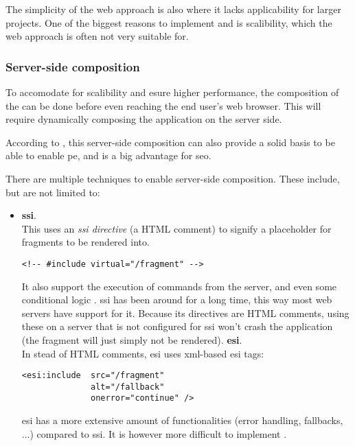 The simplicity of the web approach is also where it lacks applicability for
larger projects. One of the biggest reasons to implement
 and  is scalibility, which the
web approach is often not very suitable for.

\subsubsection{Server-side composition}

To accomodate for scalibility and esure higher performance, the composition of
the  can be done before even reaching the end user's
web browser. This will require dynamically composing the application on the
server side.

According to \textcite{Geers_2020}, this server-side composition can also
provide a solid basis to be able to enable \gls{pe}, and is a big advantage for
\gls{seo}.

There are multiple techniques to enable server-side composition. These include,
but are not limited to:
\begin{itemize}
  \item \textbf{\gls{ssi}}.\\
  This uses an \textit{\gls{ssi} directive} (a HTML comment) to signify a
  placeholder for fragments to be rendered into.
  \begin{verbatim}
<!-- #include virtual="/fragment" -->
  \end{verbatim}
  It also support the execution of commands from the server, and even some
  conditional logic \autocite{Apache_2013}. \gls{ssi} has been around for a long
  time, this way most web servers have support for it. Because its directives
  are HTML comments, using these on a server that is not configured for
  \gls{ssi} won't crash the application (the fragment will just simply not be
  rendered).
  \spacedItem  \textbf{\gls{esi}}.\\
  In stead of HTML comments, \gls{esi} uses \gls{xml}-based \gls{esi} tags:
  \begin{verbatim}
<esi:include  src="/fragment" 
              alt="/fallback" 
              onerror="continue" />
  \end{verbatim}
  \gls{esi} has a more extensive amount of functionalities (error handling,
  fallbacks, ...) compared to \gls{ssi}. It is however more difficult to
  implement \autocite{Rappl_2021}.
\end{itemize}


